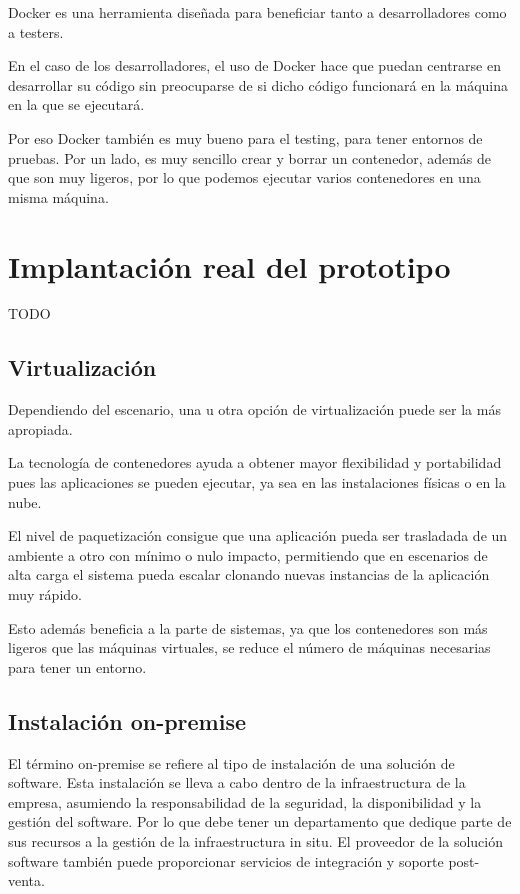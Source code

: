 Docker es una herramienta diseñada para beneficiar tanto a desarrolladores como a testers.

En el caso de los desarrolladores, el uso de Docker hace que puedan centrarse en desarrollar su código sin preocuparse de si dicho código funcionará en la máquina en la que se ejecutará.

Por eso Docker también es muy bueno para el testing, para tener entornos de pruebas. Por un lado, es muy sencillo crear y borrar un contenedor, además de que son muy ligeros, por lo que podemos ejecutar varios contenedores en una misma máquina.

\section{Implantación real del prototipo}

TODO

\subsection{Virtualización}

Dependiendo del escenario, una u otra opción de virtualización puede ser la más apropiada.

La tecnología de contenedores ayuda a obtener mayor flexibilidad y portabilidad pues las aplicaciones se pueden ejecutar, ya sea en las instalaciones físicas o en la nube.

El nivel de paquetización consigue que una aplicación pueda ser trasladada de un ambiente a otro con mínimo o nulo impacto, permitiendo que en escenarios de alta carga el sistema pueda escalar clonando nuevas instancias de la aplicación muy rápido.

Esto además beneficia a la parte de sistemas, ya que los contenedores son más ligeros que las máquinas virtuales, se reduce el número de máquinas necesarias para tener un entorno.

\subsection{Instalación on-premise}

El término on-premise se refiere al tipo de instalación de una solución de software. Esta instalación se lleva a cabo dentro de la infraestructura de la empresa, asumiendo la responsabilidad de la seguridad, la disponibilidad y la gestión del software. Por lo que debe tener un departamento que dedique parte de sus recursos a la gestión de la infraestructura in situ. El proveedor de la solución software también puede proporcionar servicios de integración y soporte post-venta.


